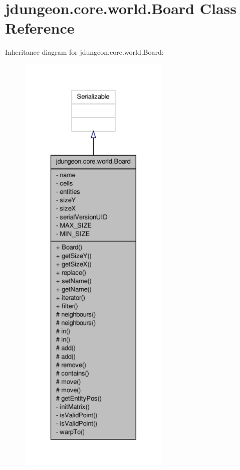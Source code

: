 \hypertarget{classjdungeon_1_1core_1_1world_1_1_board}{
\section{jdungeon.core.world.Board Class Reference}
\label{classjdungeon_1_1core_1_1world_1_1_board}
}


Inheritance diagram for jdungeon.core.world.Board:
\nopagebreak
\begin{figure}[H]
\begin{center}
\leavevmode
\includegraphics[height=600pt]{classjdungeon_1_1core_1_1world_1_1_board__inherit__graph}
\end{center}
\end{figure}


